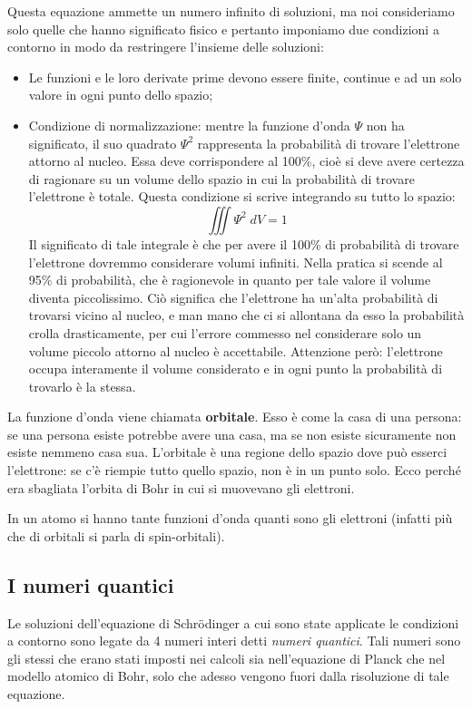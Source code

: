 Questa equazione ammette un numero infinito di soluzioni, ma noi consideriamo solo quelle che hanno significato fisico e pertanto imponiamo due condizioni a contorno in modo da restringere l'insieme delle soluzioni:
\begin{itemize}
  \item  Le funzioni e le loro derivate prime devono essere finite, continue e ad un solo valore in ogni punto dello spazio;
  \item Condizione di normalizzazione: mentre la funzione d'onda $\Psi$ non ha significato, il suo quadrato $\Psi^2$ rappresenta la probabilità di trovare l'elettrone attorno al nucleo. Essa deve corrispondere al 100\%, cioè si deve avere certezza di ragionare su un volume dello spazio in cui la probabilità di trovare l'elettrone è totale. Questa condizione si scrive integrando su tutto lo spazio:
  $$\iiint \Psi^2 \; dV=1$$
  Il significato di tale integrale è che per avere il 100\% di probabilità di trovare l'elettrone dovremmo considerare volumi infiniti. Nella pratica si scende al 95\% di probabilità, che è ragionevole in quanto per tale valore il volume diventa piccolissimo. Ciò significa che l'elettrone ha un'alta probabilità di trovarsi vicino al nucleo, e man mano che ci si allontana da esso la probabilità crolla drasticamente, per cui l'errore commesso nel considerare solo un volume piccolo attorno al nucleo è accettabile. Attenzione però: l'elettrone occupa interamente il volume considerato e in ogni punto la probabilità di trovarlo è la stessa.
\end{itemize}
La funzione d'onda viene chiamata \textbf{orbitale}. Esso è come la casa di una persona: se una persona esiste potrebbe avere una casa, ma se non esiste sicuramente non esiste nemmeno casa sua. L'orbitale è una regione dello spazio dove può esserci l'elettrone: se c'è riempie tutto quello spazio, non è in un punto solo. Ecco perché era sbagliata l'orbita di Bohr in cui si muovevano gli elettroni. 

In un atomo si hanno tante funzioni d'onda quanti sono gli elettroni (infatti più che di orbitali si parla di spin-orbitali).
\subsection{I numeri quantici}
Le soluzioni dell'equazione di Schrödinger a cui sono state applicate le condizioni a contorno sono legate da 4 numeri interi detti \textit{numeri quantici}. Tali numeri sono gli stessi che erano stati imposti nei calcoli sia nell'equazione di Planck che nel modello atomico di Bohr, solo che adesso vengono fuori dalla risoluzione di tale equazione.

